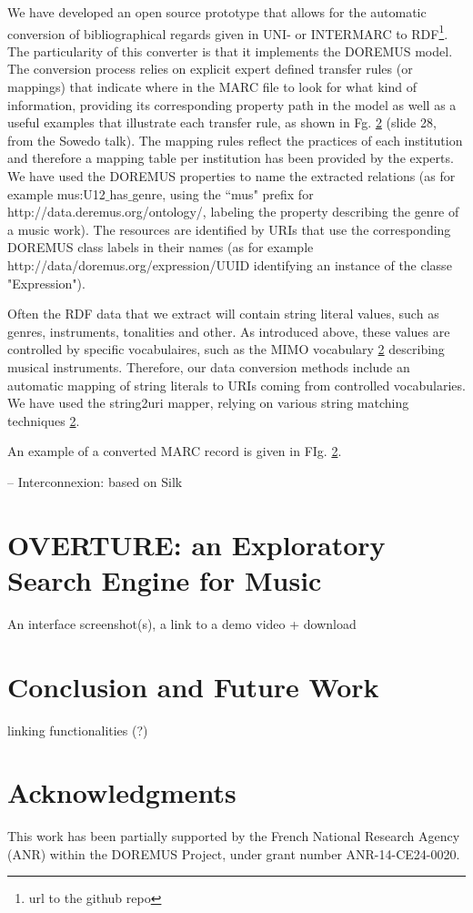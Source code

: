 \documentclass[runningheads,a4paper]{llncs}
\begin{document}
We have developed an open source prototype that allows for the automatic conversion of bibliographical regards given in UNI- or INTERMARC to RDF\footnote{url to the github repo}. The particularity of this converter is that it implements the DOREMUS model. The conversion process relies on explicit expert defined transfer rules (or mappings) that indicate where in the MARC file to look for what kind of information, providing its corresponding property path in the model as well as a useful examples that illustrate each transfer rule, as shown in Fg. \ref{} (slide 28, from the Sowedo talk). The mapping rules reflect the practices of each institution and therefore a mapping table per institution has been provided by the experts. We have used the DOREMUS properties to name the extracted relations (as for example mus:U12$\_$has$\_$genre, using the ``mus" prefix for http://data.deremus.org/ontology/, labeling the property describing the genre of a music work). The resources are identified by URIs that use the corresponding DOREMUS class labels in their names (as for example http://data/doremus.org/expression/UUID identifying an instance of the classe "Expression"). 

Often the RDF data that we extract will contain string literal values, such as genres, instruments, tonalities and other. As introduced above, these values are controlled by specific vocabulaires, such as the MIMO vocabulary \ref{} describing musical instruments. Therefore, our data conversion methods include an automatic mapping of string literals to URIs coming from controlled vocabularies. We have used the string2uri mapper, relying on various string matching techniques \ref{}.

An example of a converted MARC record is given in FIg. \ref{}.  

-- Interconnexion: based on Silk


\section{OVERTURE: an Exploratory Search Engine for Music}

An interface screenshot(s), a link to a demo video + download


\section{Conclusion and Future Work}

linking functionalities (?)

\section*{Acknowledgments}
This work has been partially supported by the French National Research Agency (ANR) within the DOREMUS Project, under grant number ANR-14-CE24-0020.



\end{document}
